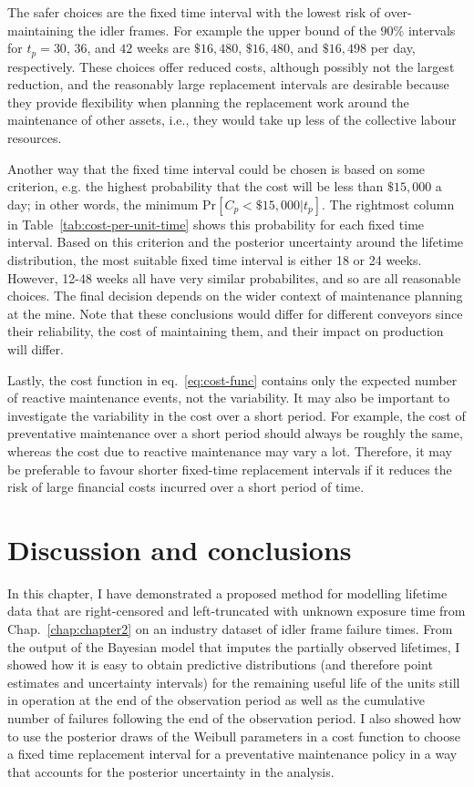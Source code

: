 

The safer choices are the fixed time interval with the lowest risk of over-maintaining the idler frames. For example the upper bound of the $90\%$ intervals for $t_p = 30$, $36$, and $42$ weeks are $\$16,480$, $\$16,480$, and $\$16,498$ per day, respectively. These choices offer reduced costs, although possibly not the largest reduction, and the reasonably large replacement intervals are desirable because they provide flexibility when planning the replacement work around the maintenance of other assets, i.e., they would take up less of the collective labour resources.

Another way that the fixed time interval could be chosen is based on some criterion, e.g. the highest probability that the cost will be less than $\$15,000$ a day; in other words, the minimum $\text{Pr}\left[C_p < \$15,000 | t_p \right]$. The rightmost column in Table~\ref{tab:cost-per-unit-time} shows this probability for each fixed time interval. Based on this criterion and the posterior uncertainty around the lifetime distribution, the most suitable fixed time interval is either 18 or 24 weeks. However, 12-48 weeks all have very similar probabilites, and so are all reasonable choices. The final decision depends on the wider context of maintenance planning at the mine. Note that these conclusions would differ for different conveyors since their reliability, the cost of maintaining them, and their impact on production will differ. 

Lastly, the cost function in eq.~\eqref{eq:cost-func} contains only the expected number of reactive maintenance events, not the variability. It may also be important to investigate the variability in the cost over a short period. For example, the cost of preventative maintenance over a short period should always be roughly the same, whereas the cost due to reactive maintenance may vary a lot. Therefore, it may be preferable to favour shorter fixed-time replacement intervals if it reduces the risk of large financial costs incurred over a short period of time.

\section{Discussion and conclusions} \label{sec:idler-frame-conclusions}

In this chapter, I have demonstrated a proposed method for modelling lifetime data that are right-censored and left-truncated with unknown exposure time from Chap.~\ref{chap:chapter2} on an industry dataset of idler frame failure times. From the output of the Bayesian model that imputes the partially observed lifetimes, I showed how it is easy to obtain predictive distributions (and therefore point estimates and uncertainty intervals) for the remaining useful life of the units still in operation at the end of the observation period as well as the cumulative number of failures following the end of the observation period. I also showed how to use the posterior draws of the Weibull parameters in a cost function to choose a fixed time replacement interval for a preventative maintenance policy in a way that accounts for the posterior uncertainty in the analysis.

